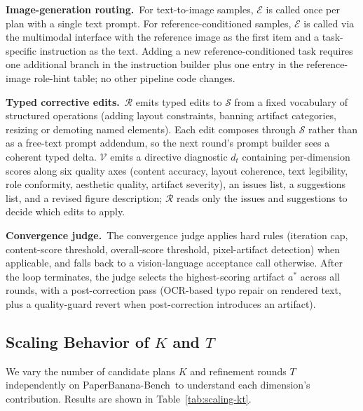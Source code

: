 \documentclass{llmxive}
\providecommand{\PaperBananaBench}{PaperBanana-Bench\xspace}
\begin{document}
\noindent\textbf{Image-generation routing.}\
For text-to-image samples, $\mathcal{E}$ is called once per plan \citep{si2023spokenwoz, si2026goalplanjustwish} with a single text prompt. For reference-conditioned samples, $\mathcal{E}$ is called via the multimodal interface with the reference image as the first item and a task-specific instruction as the text. Adding a new reference-conditioned task requires one additional branch in the instruction builder plus one entry in the reference-image role-hint table; no other pipeline code changes.

\noindent\textbf{Typed corrective edits.}\
$\mathcal{R}$ emits typed edits to $\mathcal{S}$ from a fixed vocabulary of structured operations (adding layout constraints, banning artifact categories, resizing or demoting named elements). Each edit composes through $\mathcal{S}$ rather than as a free-text prompt addendum, so the next round's prompt builder sees a coherent typed delta. $\mathcal{V}$ emits a directive diagnostic $d_t$ containing per-dimension scores along six quality axes (content accuracy, layout coherence, text legibility, role conformity, aesthetic quality, artifact severity), an issues list, a suggestions list, and a revised figure description; $\mathcal{R}$ reads only the issues and suggestions to decide which edits to apply.

\noindent\textbf{Convergence judge.}\
The convergence judge applies hard rules (iteration cap, content-score threshold, overall-score threshold, pixel-artifact detection) when applicable, and falls back to a vision-language acceptance call otherwise. After the loop terminates, the judge selects the highest-scoring artifact $a^*$ across all rounds, with a post-correction pass (OCR-based typo repair on rendered text, plus a quality-guard revert when post-correction introduces an artifact).

\subsection{Scaling Behavior of \texorpdfstring{$K$}{K} and \texorpdfstring{$T$}{T}}
\label{app:scaling}

We vary the number of candidate plans $K$ and refinement rounds $T$ independently on \PaperBananaBench\ to understand each dimension's contribution. Results are shown in Table~\ref{tab:scaling-kt}.
\end{document}
